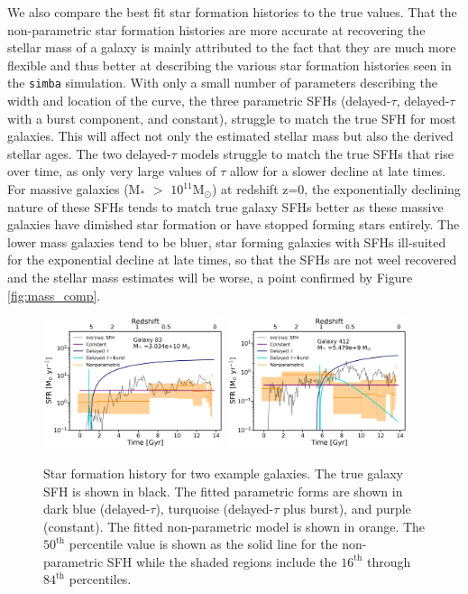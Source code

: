 \documentclass[twocolumn]{aastex62}
\begin{document}
We also compare the best fit star formation histories to the true values. That the non-parametric star formation histories are more accurate at recovering the stellar mass of a galaxy is mainly attributed to the fact that they are much more flexible and thus better at describing the various star formation histories seen in the \texttt{simba} simulation. With only a small number of parameters describing the width and location of the curve, the three parametric SFHs (delayed-$\tau$, delayed-$\tau$ with a burst component, and constant), struggle to match the true SFH for most galaxies. This will affect not only the estimated stellar mass but also the derived stellar ages. The two delayed-$\tau$ models struggle to match the true SFHs that rise over time, as only very large values of $\tau$ allow for a slower decline at late times. For massive galaxies (M$_*$ $>$ $10^{11} \mathrm{M_{\odot}}$) at redshift z=0, the exponentially declining nature of these SFHs tends to match true galaxy SFHs better as these massive galaxies have dimished star formation or have stopped forming stars entirely. The lower mass galaxies tend to be bluer, star forming galaxies with SFHs ill-suited for the exponential decline at late times, so that the SFHs are not weel recovered and the stellar mass estimates will be worse, a point confirmed by Figure \ref{fig:mass_comp}.

\begin{figure}[h]

\centering
\includegraphics[width=0.47\textwidth]{SFH_83.png}
\includegraphics[width=0.47\textwidth]{SFH_412.png}

\caption{Star formation history for two example galaxies. The true galaxy SFH is shown in black. The fitted parametric forms are shown in dark blue (delayed-$\tau$), turquoise (delayed-$\tau$ plus burst), and purple (constant). The fitted non-parametric model is shown in orange. The $50^{\mathrm{th}}$ percentile value is shown as the solid line for the non-parametric SFH while the shaded regions include the $16^{\mathrm{th}}$ through $84^{\mathrm{th}}$ percentiles.}
\label{fig:sfh}

\end{figure}
\end{document}
